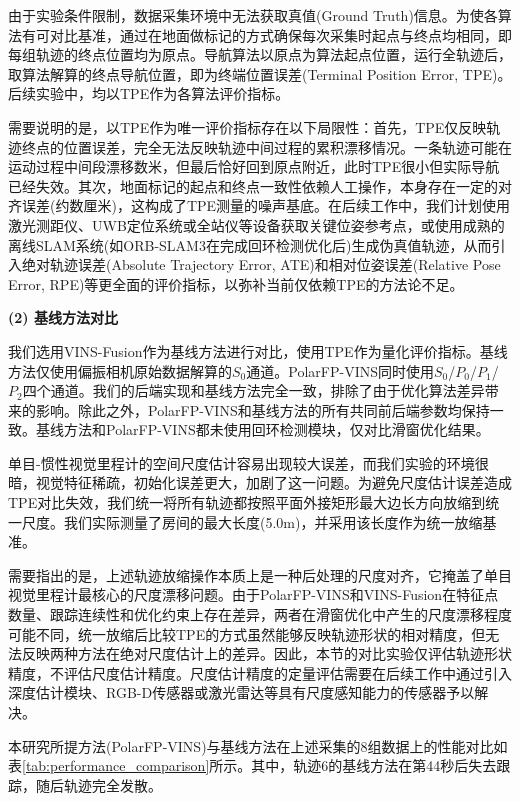 由于实验条件限制，数据采集环境中无法获取真值(Ground Truth)信息。为使各算法有可对比基准，通过在地面做标记的方式确保每次采集时起点与终点均相同，即每组轨迹的终点位置均为原点。导航算法以原点为算法起点位置，运行全轨迹后，取算法解算的终点导航位置，即为终端位置误差(Terminal Position Error, TPE)。后续实验中，均以TPE作为各算法评价指标。

需要说明的是，以TPE作为唯一评价指标存在以下局限性：首先，TPE仅反映轨迹终点的位置误差，完全无法反映轨迹中间过程的累积漂移情况。一条轨迹可能在运动过程中间段漂移数米，但最后恰好回到原点附近，此时TPE很小但实际导航已经失效。其次，地面标记的起点和终点一致性依赖人工操作，本身存在一定的对齐误差(约数厘米)，这构成了TPE测量的噪声基底。在后续工作中，我们计划使用激光测距仪、UWB定位系统或全站仪等设备获取关键位姿参考点，或使用成熟的离线SLAM系统(如ORB-SLAM3\cite{campos2021orbslam3}在完成回环检测优化后)生成伪真值轨迹，从而引入绝对轨迹误差(Absolute Trajectory Error, ATE)和相对位姿误差(Relative Pose Error, RPE)等更全面的评价指标，以弥补当前仅依赖TPE的方法论不足。


\textbf{(2) 基线方法对比}

我们选用VINS-Fusion\cite{qin2019vinsfusion}作为基线方法进行对比，使用TPE作为量化评价指标。基线方法仅使用偏振相机原始数据解算的$S_0$通道。PolarFP-VINS同时使用$S_0$/$P_0$/$P_1$/$P_2$四个通道。我们的后端实现和基线方法完全一致，排除了由于优化算法差异带来的影响。除此之外，PolarFP-VINS和基线方法的所有共同前后端参数均保持一致。基线方法和PolarFP-VINS都未使用回环检测模块，仅对比滑窗优化结果。

单目-惯性视觉里程计的空间尺度估计容易出现较大误差，而我们实验的环境很暗，视觉特征稀疏，初始化误差更大，加剧了这一问题。为避免尺度估计误差造成TPE对比失效，我们统一将所有轨迹都按照平面外接矩形最大边长方向放缩到统一尺度。我们实际测量了房间的最大长度(5.0m)，并采用该长度作为统一放缩基准。

需要指出的是，上述轨迹放缩操作本质上是一种后处理的尺度对齐，它掩盖了单目视觉里程计最核心的尺度漂移问题。由于PolarFP-VINS和VINS-Fusion在特征点数量、跟踪连续性和优化约束上存在差异，两者在滑窗优化中产生的尺度漂移程度可能不同，统一放缩后比较TPE的方式虽然能够反映轨迹形状的相对精度，但无法反映两种方法在绝对尺度估计上的差异。因此，本节的对比实验仅评估轨迹形状精度，不评估尺度估计精度。尺度估计精度的定量评估需要在后续工作中通过引入深度估计模块、RGB-D传感器或激光雷达等具有尺度感知能力的传感器予以解决。


本研究所提方法(PolarFP-VINS)与基线方法在上述采集的8组数据上的性能对比如表\ref{tab:performance_comparison}所示。其中，轨迹6的基线方法在第44秒后失去跟踪，随后轨迹完全发散。



